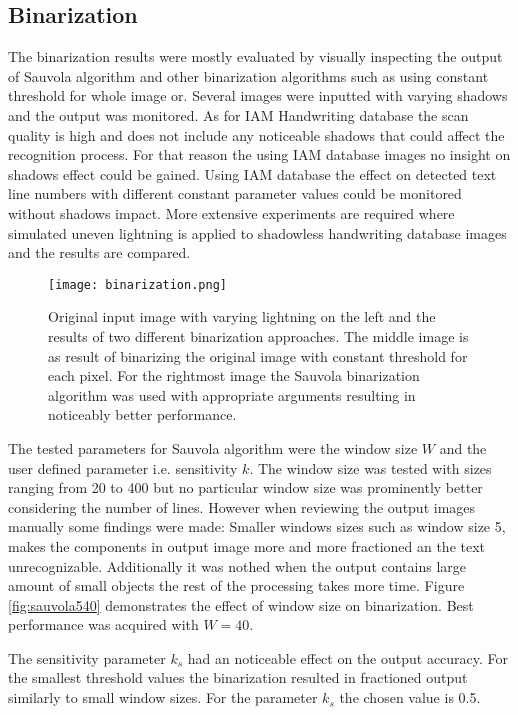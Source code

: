 \documentclass{article}
\begin{document}
  \subsection{Binarization}
    The binarization results were mostly evaluated by visually inspecting the output of Sauvola algorithm and other binarization algorithms such as using constant threshold for whole image or. Several images were inputted with varying shadows and the output was monitored. As for IAM Handwriting database the scan quality is high and does not include any noticeable shadows that could affect the recognition process. For that reason the using IAM database images no insight on shadows effect could be gained. Using IAM database the effect on detected text line numbers with different constant parameter values could be monitored without shadows impact. More extensive experiments are required where simulated uneven lightning is applied to shadowless handwriting database images and the results are compared.

    \begin{figure}[!ht]
      \centering
      \texttt{[image: binarization.png]}
      \caption{Original input image with varying lightning on the left and the results of two different binarization approaches. The middle image is as result of binarizing the original image with constant threshold for each pixel. For the rightmost image the Sauvola binarization algorithm was used with appropriate arguments resulting in noticeably better performance. \label{fig:binarization}}
    \end{figure}


    The tested parameters for Sauvola algorithm were the window size $W$ and the user defined parameter i.e. sensitivity $k$. The window size was tested with sizes ranging from 20 to 400 but no particular window size was prominently better considering the number of lines. However when reviewing the output images manually some findings were made: Smaller windows sizes such as window size 5, makes the components in output image more and more fractioned an the text unrecognizable. Additionally it was nothed when the output contains large amount of small objects the rest of the processing takes more time. Figure \ref{fig:sauvola540} demonstrates the effect of window size on binarization. Best performance was acquired with $W = 40$.

    The sensitivity parameter $k_s$ had an noticeable effect on the output accuracy. For the smallest threshold values the binarization resulted in fractioned output similarly to small window sizes. For the parameter $k_s$ the chosen value is 0.5.
\end{document}
